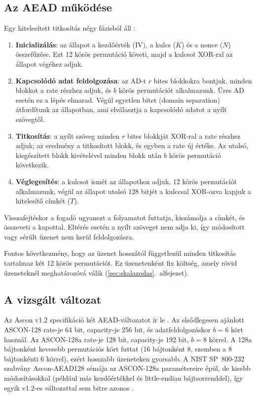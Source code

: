 \documentclass[a4paper,12pt]{report}
\theoremstyle{definition}
\theoremstyle{remark}
\begin{document}
\subsection{Az AEAD működése}\label{sec:ascon_aead}

Egy hitelesített titkosítás négy fázisból áll \cite{Dobraunig2021}:

\begin{enumerate}
	\item \textbf{Inicializálás}: az állapot a kezdőérték (IV), a kulcs ($K$) és a nonce ($N$) összefűzése. Ezt 12 körös permutáció követi, majd a kulcsot XOR-ral az állapot végéhez adjuk.
	\item \textbf{Kapcsolódó adat feldolgozása}: az AD-t $r$ bites blokkokra bontjuk, minden blokkot a rate részhez adjuk, és $b$ körös permutációt alkalmazunk. Üres AD esetén ez a lépés elmarad. Végül egyetlen bitet (domain separation) átfordítunk az állapotban, ami elválasztja a kapcsolódó adatot a nyílt szövegtől.
	\item \textbf{Titkosítás}: a nyílt szöveg minden $r$ bites blokkját XOR-ral a rate részhez adjuk; az eredmény a titkosított blokk, és egyben a rate új értéke. Az utolsó, kiegészített blokk kivételével minden blokk után $b$ körös permutáció következik.
	\item \textbf{Véglegesítés}: a kulcsot ismét az állapothoz adjuk, 12 körös permutációt alkalmazunk, végül az állapot utolsó 128 bitjét a kulccsal XOR-ozva kapjuk a hitelesítő címkét ($T$).
\end{enumerate}

Visszafejtéskor a fogadó ugyanezt a folyamatot futtatja, kiszámolja a címkét, és összeveti a kapottal. Eltérés esetén a nyílt szöveget nem adja ki, így módosított vagy sérült üzenet nem kerül feldolgozásra.

Fontos következmény, hogy az üzenet hosszától függetlenül minden titkosítás tartalmaz két 12 körös permutációt. Ez üzenetenként fix költség, amely rövid üzeneteknél meghatározóvá válik (\ref{sec:skalazodas}.~alfejezet).

\subsection{A vizsgált változat}\label{sec:ascon_valtozat}

Az Ascon v1.2 specifikáció két AEAD-változatot ír le \cite{Dobraunig2021}. Az elsődlegesen ajánlott ASCON-128 rate-je 64 bit, capacity-je 256 bit, és adatfeldolgozáskor $b = 6$ kört használ. Az ASCON-128a rate-je 128 bit, capacity-je 192 bit, $b = 8$ körrel. A 128a bájtonként kevesebb permutációs kört futtat (16 bájtonként 8, szemben a 8 bájtonkénti 6 körrel), ezért hosszabb üzeneteken gyorsabb. A NIST SP~800-232 szabvány Ascon-AEAD128 sémája az ASCON-128a paramétereire épül, de kisebb módosításokkal (például más kezdőértékkel és little-endian bájtsorrenddel), így egyik v1.2-es változattal sem bitre azonos \cite{NISTSP800232}.
\end{document}
